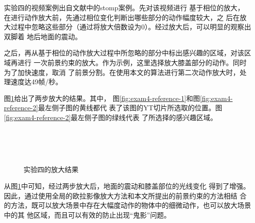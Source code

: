 实验四的视频案例出自文献\cite{Wadhwa2013PhaseBased}中的stomp案例。先对该视频进行
基于相位的放大，在进行动作放大前，先通过相位变化判断出哪些部分的动作幅度较大，之
后在放大过程中忽略这些部分（通过将放大倍数设为0）。经过放大后，可以明显的观察出双脚着
地后地面的震动。

之后，再从基于相位的动作放大过程中所忽略的部分中标出感兴趣的区域，对该区域再进行
一次前景约束的放大。作为示例，这里选择放大膝盖部分的动作。同时为了加快速度，取消
了前景分割。在使用本文的算法进行第二次动作放大时，处理速度达49帧/秒。

图\ref{fig:exam4-result}给出了两步放大的结果。其中，
图\ref{fig:exam4-reference-1}和图\ref{fig:exam4-reference-2}最左侧子图的黄线都代
表了该图的YT切片所选取的位置。图\ref{fig:exam4-reference-2}最左侧子图的绿线代表
了所选择的感兴趣区域。

\begin{figure}[htbp]
  \centering
  \\
  \\
  \\
  \caption{实验四的放大结果}
  \label{fig:exam4-result}
\end{figure}

从图\ref{fig:exam4-result}中可知，经过两步放大后，地面的震动和膝盖部位的光线变化
得到了增强。因此，通过使用全局的欧拉影像放大方法和本文所提出的前景约束的方法相结
合的方法，既可以放大场景中存在大幅度动作的物体中的细微动作，也可以放大场景中的其
他区域，而且可以有效的防止出现“鬼影”问题。

